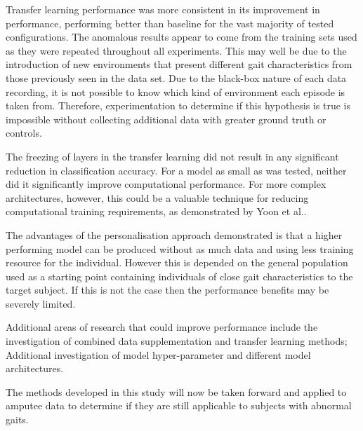Transfer learning performance was more consistent in its improvement in performance, performing better than baseline for the vast majority of tested configurations. The anomalous results appear to come from the training sets used as they were repeated throughout all experiments. This may well be due to the introduction of new environments that present different gait characteristics from those previously seen in the data set. Due to the black-box nature of each data recording, it is not possible to know which kind of environment each episode is taken from. Therefore, experimentation to determine if this hypothesis is true is impossible without collecting additional data with greater ground truth or controls.

The freezing of layers in the transfer learning did not result in any significant reduction in classification accuracy. For a model as small as was tested, neither did it significantly improve computational performance. For more complex architectures, however, this could be a valuable technique for reducing computational training requirements, as demonstrated by Yoon et al.\cite{Yoon2017}.

The advantages of the personalisation approach demonstrated is that a higher performing model can be produced without as much data and using less training resource for the individual. However this is depended on the general population used as a starting point containing individuals of close gait characteristics to the target subject. If this is not the case then the performance benefits may be severely limited.

Additional areas of research that could improve performance include the investigation of combined data supplementation and transfer learning methods; Additional investigation of model hyper-parameter and different model architectures.

The methods developed in this study will now be taken forward and applied to amputee data to determine if they are still applicable to subjects with abnormal gaits.